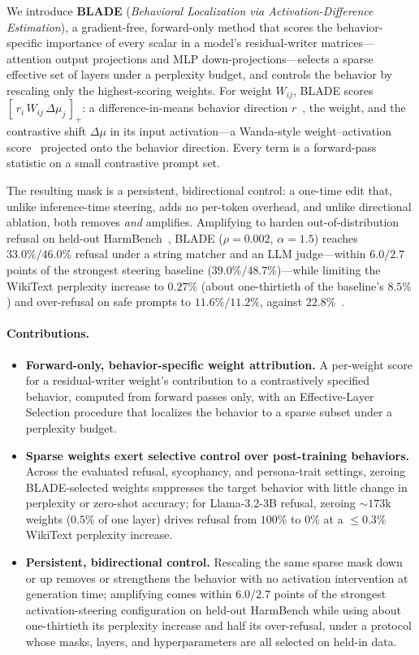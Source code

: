 We introduce \textbf{BLADE} (\emph{Behavioral Localization via Activation-Difference Estimation}), a
gradient-free, forward-only method that scores the behavior-specific importance of every scalar in a
model's residual-writer matrices---attention output projections and MLP down-projections---selects a
sparse effective set of layers under a perplexity budget, and controls the behavior by rescaling only
the highest-scoring weights. For weight $W_{ij}$, BLADE scores $\left[\,r_i\,W_{ij}\,\Delta\mu_j\,
\right]_+$: a difference-in-means behavior direction $r$~\cite{arditi2024refusal}, the weight, and the
contrastive shift $\Delta\mu$ in its input activation---a Wanda-style weight--activation
score~\cite{sun2023wanda} projected onto the behavior direction. Every term is a forward-pass
statistic on a small contrastive prompt set.

The resulting mask is a persistent, bidirectional control: a one-time edit that, unlike inference-time
steering, adds no per-token overhead, and unlike directional ablation, both removes \emph{and}
amplifies. Amplifying to harden out-of-distribution refusal on held-out
HarmBench~\cite{mazeika2024harmbench}, BLADE ($\rho{=}0.002$, $\alpha{=}1.5$) reaches $33.0\%/46.0\%$
refusal under a string matcher and an LLM judge---within $6.0/2.7$ points of the strongest steering
baseline ($39.0\%/48.7\%$)---while limiting the WikiText perplexity increase to $0.27\%$ (about
one-thirtieth of the baseline's $8.5\%$) and over-refusal on safe prompts to $11.6\%/11.2\%$, against
$22.8\%$~\cite{rottger2024xstest}.

\paragraph{Contributions.}
\begin{itemize}
  \item \textbf{Forward-only, behavior-specific weight attribution.} A per-weight score for a
    residual-writer weight's contribution to a contrastively specified behavior, computed from
    forward passes only, with an Effective-Layer Selection procedure that localizes the behavior to a
    sparse subset under a perplexity budget.
  \item \textbf{Sparse weights exert selective control over post-training behaviors.} Across the
    evaluated refusal, sycophancy, and persona-trait settings, zeroing BLADE-selected weights
    suppresses the target behavior with little change in perplexity or zero-shot accuracy; for
    Llama-3.2-3B refusal, zeroing $\sim\!173$k weights ($0.5\%$ of one layer) drives refusal from
    $100\%$ to $0\%$ at a $\le\!0.3\%$ WikiText perplexity increase.
  \item \textbf{Persistent, bidirectional control.} Rescaling the same sparse mask down or up
    removes or strengthens the behavior with no activation intervention at generation time; amplifying
    comes within $6.0/2.7$ points of the strongest activation-steering configuration on held-out
    HarmBench while using about one-thirtieth its perplexity increase and half its over-refusal, under
    a protocol whose masks, layers, and hyperparameters are all selected on held-in data.
\end{itemize}
